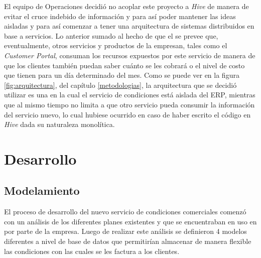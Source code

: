   El equipo de Operaciones decidió no acoplar este proyecto a \textit{Hive} de manera de evitar el cruce indebido de información y para así poder mantener las ideas aisladas y para así comenzar a tener una arquitectura de sistemas distribuidos en base a servicios. Lo anterior sumado al hecho de que el se prevee que, eventualmente, otros servicios y productos de la empresan, tales como el \textit{Customer Portal}, consuman los recursos expuestos por este servicio de manera de que los clientes también puedan saber cuánto se les cobrará o el nivel de costo que tienen para un día determinado del mes. Como se puede ver en la figura \ref{fig:arquitectura}, del capítulo \ref{metodologias}, la arquitectura que se decidió utilizar es una en la cual el servicio de condiciones está aislada del ERP, mientras que al mismo tiempo no limita a que otro servicio pueda consumir la información del servicio nuevo, lo cual hubiese ocurrido en caso de haber escrito el código en \textit{Hive} dada su naturaleza monolítica.

\section{Desarrollo}

  \subsection{Modelamiento}

    El proceso de desarrollo del nuevo servicio de condiciones comerciales comenzó con un análisis de los diferentes planes existentes y que se encuentraban en uso en por parte de la empresa. Luego de realizar este análisis se definieron 4 modelos diferentes a nivel de base de datos que permitirían almacenar de manera flexible las condiciones con las cuales se les factura a los clientes. 
    

